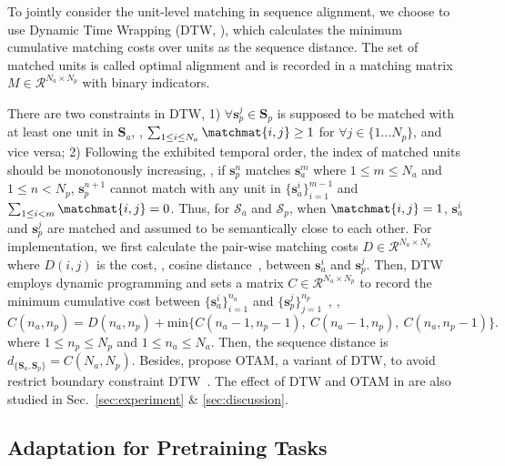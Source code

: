  To jointly consider the unit-level matching in sequence alignment, we choose to use Dynamic Time Wrapping (DTW, \citet{muller2007dynamic}), which calculates the minimum cumulative matching costs over units as the sequence distance. The set of matched units is called optimal alignment and is recorded in a matching matrix $M \in \mathcal{R}^{N_a \times N_p}$ with binary indicators.

There are two constraints in DTW, 1) $\forall \mathbf{s}_p^j \in \mathbf{S}_p$ is supposed to be matched with at least one unit in $\mathbf{S}_a$, \ie, $\sum_{1 \leq i \leq N_a} \matchmat{i,j} \geq 1$ for $\forall j \in \{1...N_p\}$, and vice versa; 2) Following the exhibited temporal order, the index of matched units should be monotonously increasing, \ie, if $\mathbf{s}_p^n$ matches $\mathbf{s}_a^m$ where $1 \leq m \leq N_a$ and $1 \leq n < N_p$, $\mathbf{s}_p^{n+1}$ cannot match with any unit in $\{\mathbf{s}_a^i\}_{i=1}^{m-1}$ and $\sum_{1 \leq i < m} \matchmat{i,j} = 0$.
Thus, for $\mathcal{S}_a$ and $\mathcal{S}_p$, when $\matchmat{i,j}=1$, $\mathbf{s}_a^i$ and $\mathbf{s}_p^j$ are matched and assumed to be semantically close to each other. For implementation, we first calculate the pair-wise matching costs $D \in \mathcal{R}^{N_a \times N_p}$ where $D(i,j)$ is the cost, \ie, cosine distance~\citep{singhal2001modern}, between $\mathbf{s}_a^i$ and $\mathbf{s}_p^j$. 
Then, DTW employs dynamic programming and sets a matrix $C \in \mathcal{R}^{N_a \times N_p}$ to record the minimum cumulative cost between $\{\mathbf{s}_a^i\}_{i=1}^{n_a}$ and $\{\mathbf{s}_p^j\}_{j=1}^{n_p}$~\citep{wang2020alignnet,dixit1990optimization}, \ie,
\begin{equation}\label{eq:dtw}
    C(n_a,n_p) = D(n_a,n_p) + \text{min} \{C(n_a-1, n_p-1),~C (n_a-1,n_p),~C(n_a,n_p-1)\}.
\end{equation}
where $1 \leq n_p \leq N_p$ and $1 \leq n_a \leq N_a$. Then, the sequence distance is $d_{\{\mathbf{S}_a,\mathbf{S}_p\}} = C(N_a,N_p)$.
Besides, \citet{cao2020few} propose OTAM, a variant of DTW, to avoid restrict boundary constraint DTW~\citep{muller2007dynamic}. The effect of DTW and OTAM in \approach{} are also studied in Sec.~\ref{sec:experiment} \& \ref{sec:discussion}.

\subsection{Adaptation for Pretraining Tasks}\label{sec:application}

